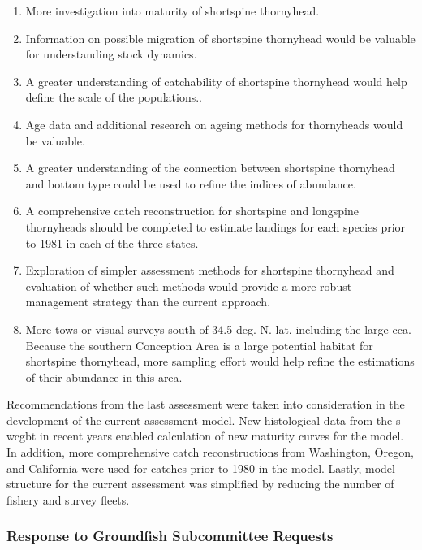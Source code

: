 \documentclass[11pt,
  english,
  letterpaper,
]{article}
\providecommand{\tightlist}{%
  \setlength{\itemsep}{0pt}\setlength{\parskip}{0pt}}
\providecommand{\tightlist}{%
  \setlength{\itemsep}{0pt}\setlength{\parskip}{0pt}}
\begin{document}
\begin{enumerate}
\def\labelenumi{\arabic{enumi}.}
\tightlist
\item
  More investigation into maturity of shortspine thornyhead.
\item
  Information on possible migration of shortspine thornyhead would be valuable for understanding stock dynamics.
\item
  A greater understanding of catchability of shortspine thornyhead would help define the scale of the populations..
\item
  Age data and additional research on ageing methods for thornyheads would be valuable.
\item
  A greater understanding of the connection between shortspine thornyhead and bottom type could be used to refine the indices of abundance.
\item
  A comprehensive catch reconstruction for shortspine and longspine thornyheads should be completed to estimate landings for each species prior to 1981 in each of the three states.
\item
  Exploration of simpler assessment methods for shortspine thornyhead and evaluation of whether such methods would provide a more robust management strategy than the current approach.
\item
  More tows or visual surveys south of 34.5 deg. N. lat. including the large \gls{cca}. Because the southern Conception Area is a large potential habitat for shortspine thornyhead, more sampling effort would help refine the estimations of their abundance in this area.
\end{enumerate}

Recommendations from the last assessment were taken into consideration in the development of the current assessment model. New histological data from the \gls{s-wcgbt} in recent years enabled calculation of new maturity curves for the model. In addition, more comprehensive catch reconstructions from Washington, Oregon, and California were used for catches prior to 1980 in the model. Lastly, model structure for the current assessment was simplified by reducing the number of fishery and survey fleets.

\hypertarget{response-to-groundfish-subcommittee-requests}{%
\subsubsection{Response to Groundfish Subcommittee Requests}\label{response-to-groundfish-subcommittee-requests}}
\end{document}
